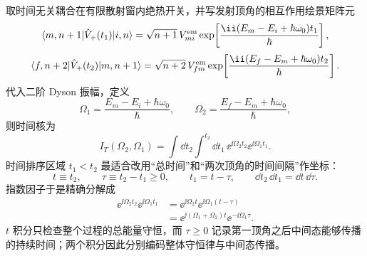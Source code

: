 \begin{derivation}[两次量子发射的时间排序与中间态]
取时间无关耦合在有限散射窗内绝热开关，并写发射顶角的相互作用绘景矩阵元
\[
\langle m,n+1|\hat V_+(t_1)|i,n\rangle
=\sqrt{n+1}\,V^{\rm em}_{mi}
\exp\!\left[
\frac{\ii(E_m-E_i+\hbar\omega_0)t_1}{\hbar}
\right],
\]
\[
\langle f,n+2|\hat V_+(t_2)|m,n+1\rangle
=\sqrt{n+2}\,V^{\rm em}_{fm}
\exp\!\left[
\frac{\ii(E_f-E_m+\hbar\omega_0)t_2}{\hbar}
\right].
\]
代入二阶 Dyson 振幅，定义
\[
\Omega_1=\frac{E_m-E_i+\hbar\omega_0}{\hbar},
\qquad
\Omega_2=\frac{E_f-E_m+\hbar\omega_0}{\hbar},
\]
则时间核为
\[
I_T(\Omega_2,\Omega_1)
=\int\dd t_2\int^{t_2}\dd t_1\,
\ee^{\ii\Omega_2t_2}\ee^{\ii\Omega_1t_1}.
\]
时间排序区域 $t_1<t_2$ 最适合改用“总时间”和“两次顶角的时间间隔”作坐标：
\begin{equation*}
 t\equiv t_2,
 \qquad
 \tau\equiv t_2-t_1\ge0,
 \qquad
 t_1=t-\tau,
 \qquad
 \dd t_2\,\dd t_1=\dd t\,\dd\tau.
\end{equation*}
指数因子于是精确分解成
\begin{align*}
 \ee^{\ii\Omega_2t_2}\ee^{\ii\Omega_1t_1}
 &=\ee^{\ii\Omega_2t}
   \ee^{\ii\Omega_1(t-\tau)}\\
 &=\ee^{\ii(\Omega_1+\Omega_2)t}
   \ee^{-\ii\Omega_1\tau}.
\end{align*}
$t$ 积分只检查整个过程的总能量守恒，而 $\tau\ge0$ 记录第一顶角之后中间态能够传播的持续时间；两个积分因此分别编码整体守恒律与中间态传播。


\end{derivation}
